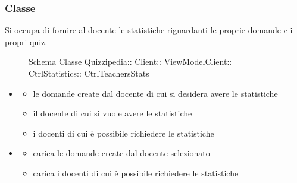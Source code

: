 \subsubsection{Classe }
Si occupa di fornire al docente le statistiche riguardanti le proprie domande e i propri quiz.
\begin{figure}[H]
\centering
\noindent{}
\caption[Schema Classe CtrlTeachersStats]{Schema Classe Quizzipedia:: Client:: ViewModelClient:: CtrlStatistics:: CtrlTeachersStats}
\end{figure}
\begin{itemize}
\item {}
\begin{itemize}
\item {}
\newline
le domande create dal docente di cui si desidera avere le statistiche
\item {}
\newline
il docente di cui si vuole avere le statistiche
\item {}
\newline
i docenti di cui è possibile richiedere le statistiche
\end{itemize}
\item {}
\begin{itemize}
\item {}
\newline
carica le domande create dal docente selezionato
\newline
\item {}
\newline
carica i docenti di cui è possibile richiedere le statistiche
\newline
\end{itemize}
\end{itemize}
